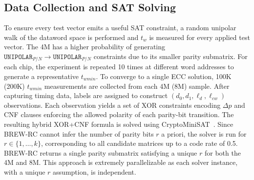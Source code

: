 \subsection{Data Collection and SAT Solving}
\label{sec:brewrc-datacollection} To ensure every test vector emits a
useful SAT constraint, a random unipolar walk of the dataword space is
performed and $t_w$ is measured for every applied test vector. The 4M
has a higher probability of generating $\texttt{UNIPOLAR}_{P/N} \to
	\texttt{UNIPOLAR}_{P/N}$ constraints due to its smaller parity
submatrix. For each chip, the experiment is repeated 10 times at
different word addresses to generate a representative $t_{wmin}$. To
converge to a single ECC solution, 100K (200K) $t_{wmin}$ measurements
are collected from each 4M (8M) sample. After capturing timing data,
labels are assigned to construct $(d_0, d_1, \ell_d, \ell_{cw})$
observations. Each observation yields a set of XOR constraints encoding
$\Delta p$ and CNF clauses enforcing the allowed polarity of each
parity-bit transition. The resulting hybrid XOR+CNF formula is solved
using CryptoMiniSAT~\cite{soos2009extending, soos2018cryptominisat5}.
Since BREW-RC cannot infer the number of parity bits $r$ a priori, the
solver is run for $r \in \{1, \ldots, k\}$, corresponding to all
candidate matrices up to a code rate of 0.5. BREW-RC returns a single
parity submatrix satisfying a unique $r$ for both the 4M and 8M. This
approach is extremely parallelizable as each solver instance, with a
unique $r$ assumption, is independent.
